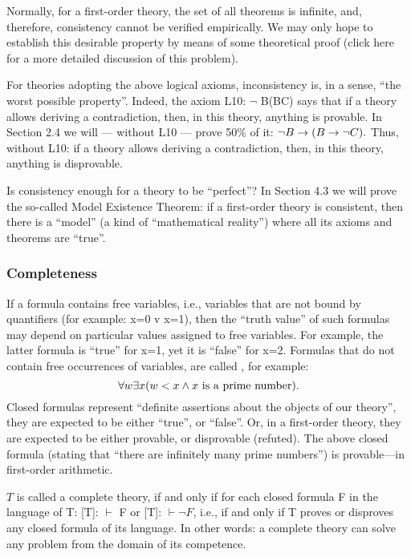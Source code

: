 Normally, for a first-order theory, the set of all theorems is infinite, and, therefore, consistency cannot be verified empirically. We may only hope to establish this desirable property by means of some theoretical proof (click here for a more detailed discussion of this problem).

For theories adopting the above logical axioms, inconsistency is, in a sense, ``the worst possible property''.  Indeed, the axiom L10: \(\neg\) B\IMPLIES (B\IMPLIES C) says that if a theory allows deriving a contradiction, then, in this theory, anything is provable. In Section 2.4 we will --- without L10 --- prove 50\% of it: \(\neg B\rightarrow (B\rightarrow \neg C).\) Thus, without L10: if a theory allows deriving a contradiction, then, in this theory, anything is disprovable.

Is consistency enough for a theory to be ``perfect''?
In Section 4.3 we will prove the so-called Model Existence Theorem: if a first-order theory is consistent, then there is a ``model'' (a kind of ``mathematical reality'') where all its axioms and theorems are ``true''.

\subsubsection{Completeness}

If a formula contains free variables, i.e., variables that are not bound by quantifiers (for example: x=0 v x=1), then the ``truth value'' of such formulas may depend on particular values assigned to free variables.  For example, the latter formula is ``true'' for x=1, yet it is ``false'' for x=2. Formulas that do not contain free occurrences of variables, are called , for example:
\[
\forall w\exists x( w<x \wedge  x\text{ is a prime number}).
\]
Closed formulas represent ``definite assertions about the objects of our theory'', they are expected to be either ``true'', or ``false''. Or, in a first-order theory, they are expected to be either provable, or disprovable (refuted). The above closed formula (stating that ``there are infinitely many prime numbers'') is provable---in first-order arithmetic.

\(T\) is called a complete theory, if and only if for each closed formula F in the language of T: [T]: \(\vdash\) F or [T]: \(\vdash \neg F\), i.e., if and only if T proves or disproves any closed formula of its language. In other words: a complete theory can solve any problem from the domain of its competence.

